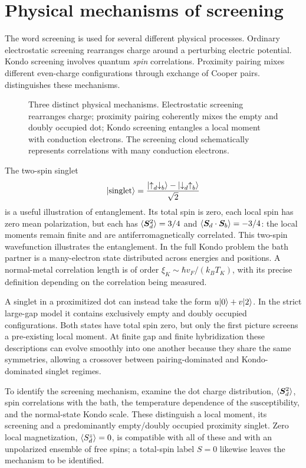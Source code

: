 \section{Physical mechanisms of screening}\label{sec:screening-picture}

The word screening is used for several different physical processes. Ordinary
electrostatic screening rearranges charge around a perturbing electric potential.
Kondo screening involves quantum \emph{spin} correlations. Proximity pairing
mixes different even-charge configurations through exchange of Cooper pairs.
 distinguishes these mechanisms.

\begin{figure}[htb]
\centering{}
\caption{Three distinct physical mechanisms. Electrostatic screening
rearranges charge; proximity pairing coherently mixes the empty and doubly occupied
dot; Kondo screening entangles a local moment with conduction electrons. The
screening cloud schematically represents correlations with many conduction electrons.}
\label{fig:primer-screening}
\end{figure}

The two-spin singlet
\begin{equation}
 \lvert \mathrm{singlet}\rangle=\frac{\lvert {\uparrow}_d{\downarrow}_b\rangle-\lvert {\downarrow}_d{\uparrow}_b\rangle}{\sqrt2}
\end{equation}
is a useful illustration of entanglement. Its total spin is zero, each local
spin has zero mean polarization, but each has $\langle \bm S_d^2\rangle=3/4$ and
$\langle \bm S_d\cdot\bm S_b\rangle=-3/4$: the local moments remain finite and are
antiferromagnetically correlated. This two-spin wavefunction illustrates the entanglement.
In the full Kondo problem the bath partner is a many-electron state distributed
across energies and positions. A normal-metal correlation length is of order
$\xi_K\sim\hbar v_F/(k_BT_K)$, with its precise definition depending on the
correlation being measured.

A singlet in a proximitized dot can instead take the form $u\lvert 0\rangle+v\lvert 2\rangle$. In the strict
large-gap model it contains exclusively empty and doubly occupied configurations. Both states have
total spin zero, but only the first picture screens a pre-existing local moment.
At finite gap and finite hybridization these descriptions can evolve smoothly
into one another because they share the same symmetries, allowing a crossover
between pairing-dominated and Kondo-dominated singlet regimes.

\begin{physics}
To identify the screening mechanism, examine the dot charge distribution,
$\langle \bm S_d^2\rangle$, spin correlations with the bath,
the temperature dependence of the susceptibility, and the normal-state Kondo
scale. These distinguish a local moment, its screening and a predominantly
empty/doubly occupied proximity singlet. Zero local magnetization,
$\langle S_d^z\rangle=0$, is compatible with all of these and with an unpolarized
ensemble of free spins; a total-spin label $S=0$ likewise leaves the mechanism to be identified.
\end{physics}

